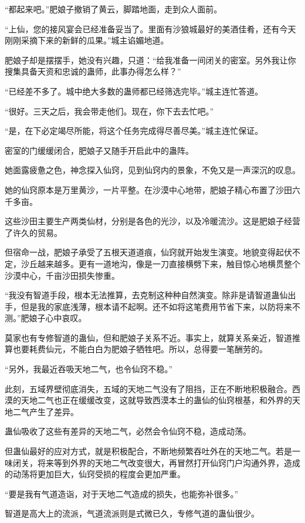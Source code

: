 \begin{this_body}
“都起来吧。”肥娘子撤销了黄云，脚踏地面，走到众人面前。

“上仙，您的接风宴会已经准备妥当了。里面有沙狼城最好的美酒佳肴，还有今天刚刚采摘下来的新鲜的瓜果。”城主谄媚地道。

肥娘子却是摆摆手，她没有兴趣，只道：“给我准备一间闭关的密室。另外我让你搜集具备天资和忠诚的蛊师，此事办得怎么样？”

“已经差不多了。城中绝大多数的蛊师都已经筛选完毕。”城主连忙答道。

“很好。三天之后，我会带走他们。现在，你下去去忙吧。”

“是，在下必定竭尽所能，将这个任务完成得尽善尽美。”城主连忙保证。

密室的门缓缓闭合，肥娘子又随手开启此中的蛊阵。

她面露疲惫之色，神念探入仙窍，见到仙窍内的景象，不免又是一声深沉的叹息。

她的仙窍原本是万里黄沙，一片平整。在沙漠中心地带，肥娘子精心布置了沙田六千多亩。

这些沙田主要生产两类仙材，分别是各色的光沙，以及冷暖流沙。这是肥娘子经营了许久的贸易。

但宿命一战，肥娘子承受了五根天道道痕，仙窍就开始发生演变。地貌变得起伏不定，沙丘越来越多。更有一道地沟，像是一刀直接横劈下来，触目惊心地横贯整个沙漠中心，千亩沙田损失惨重。

“我没有智道手段，根本无法推算，去克制这种种自然演变。除非是请智道蛊仙出手，但是我的家底浅薄，根本请不起啊。还不如将这笔费用节省下来，以防将来不测。”肥娘子心中哀叹。

莫家也有专修智道的蛊仙，但和肥娘子关系不近。事实上，就算关系亲近，智道推算也要耗费仙元，不能白白为肥娘子牺牲吧。所以，总得要一笔酬劳的。

“另外，我最近吞吸天地二气，也令仙窍不稳。”

此刻，五域界壁彻底消失，五域的天地二气没有了阻挡，正在不断地积极融合。西漠的天地二气也正在缓缓改变，这就导致西漠本土的蛊仙的仙窍根基，和外界的天地二气产生了差异。

蛊仙吸收了这些有差异的天地二气，必然会令仙窍不稳，造成动荡。

但蛊仙最好的应对方式，就是积极配合，不断地频繁吞吐外在的天地二气。若是一味闭关，将来等到外界的天地二气改变很大，再冒然打开仙窍门户沟通外界，造成的动荡将更加巨大，仙窍受损的程度会更加严重。

“要是我有气道造诣，对于天地二气造成的损失，也能弥补很多。”

智道是高大上的流派，气道流派则是式微已久，专修气道的蛊仙很少。


\end{this_body}
